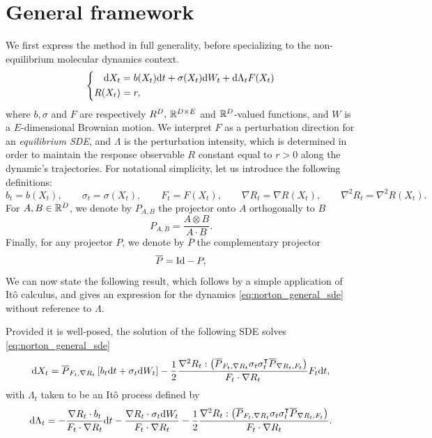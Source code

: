 \section{General framework}
We first express the method in full generality, before specializing to the non-equilibrium molecular dynamics context.
\begin{equation}
    \label{eq:norton_general_sde}
    \left\{\begin{aligned}
        \mathrm{d} X_t &= b(X_t)\mathrm{d} t +\sigma(X_t)\mathrm{d} W_t + \mathrm{d} \Lambda_t F(X_t)\\
        R(X_t)&= r,
    \end{aligned}\right.
\end{equation}
where $b ,\sigma$ and $F$ are respectively $R^D,\, \mathbb{R}^{D\times E}$ and $\mathbb{R}^D$-valued functions, and $W$ is a $E$-dimensional Brownian motion.
We interpret $F$ as a perturbation direction for an \textit{equilibrium SDE}, and $\Lambda$ is the perturbation intensity, which is determined in order to maintain the response observable $R$ constant equal to $r>0$ along the dynamic's trajectories.
For notational simplicity, let us introduce the following definitions:
\begin{equation}
    \label{eq:norton_notation}
    b_t = b(X_t),\qquad \sigma_t = \sigma(X_t),\qquad F_t= F(X_t),\qquad \nabla R_t=\nabla R(X_t),\qquad \nabla^2 R_t = \nabla^2 R(X_t).
\end{equation}
For $A,B\in\mathbb{R}^{D}$, we denote by $P_{A,B}$ the projector onto $A$ orthogonally to $B$
\begin{equation}
    \label{eq:non_orthogonal_projector}
    P_{A,B}=\frac{A\otimes B}{A\cdot B}.
\end{equation}
Finally, for any projector $P$, we denote by $\overline{P}$ the complementary projector
\begin{equation}
    \label{eq:complementary_projector}
    \overline{P}=\mathrm{Id}-P,
\end{equation}
We can now state the following result, which follows by a simple application of Itô calculus, and gives an expression for the dynamics \eqref{eq:norton_general_sde} without reference to $\Lambda$.
\begin{prop}\label{prop:norton_sde}
   Provided it is well-posed, the solution of the following SDE solves \eqref{eq:norton_general_sde}
    \begin{equation}
        \label{eq:norton_general_sde_solved}
        \mathrm{d} X_t = \overline{P}_{F_t,\nabla R_t}\left[b_t\mathrm{d} t + \sigma_t\mathrm{d} W_t\right] - \frac{1}{2}\frac{\nabla^2 R_t : \left(\overline{P}_{F_t,\nabla R_t}\sigma_t \sigma_t^\intercal\overline{P}_{\nabla R_t,F_t}\right)}{F_t\cdot \nabla R_t}F_t\mathrm{d} t,
    \end{equation}
    with $\Lambda_t$ taken to be an Itô process defined by
    \begin{equation}
        \label{eq:norton_sde_multiplier_solved}
        \mathrm{d} \Lambda_t = -\frac{\nabla R_t \cdot b_t}{F_t\cdot \nabla R_t}\mathrm{d} t-\frac{\nabla R_t\cdot \sigma_t\mathrm{d} W_t}{F_t\cdot \nabla R_t}-\frac12\frac{\nabla^2 R_t : \left(\overline{P}_{F_t,\nabla R_t}\sigma_t\sigma_t^\intercal\overline{P}_{\nabla R_t,F_t}\right)}{F_t\cdot \nabla R_t}.
    \end{equation}
\end{prop}
